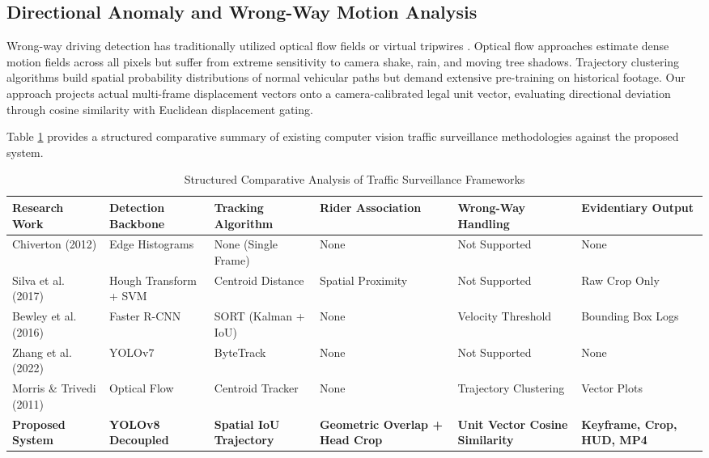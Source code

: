 \documentclass[conference]{IEEEtran}
\begin{document}
\subsection{Directional Anomaly and Wrong-Way Motion Analysis}
Wrong-way driving detection has traditionally utilized optical flow fields or virtual tripwires \cite{veeraraghavan2003computer}. Optical flow approaches estimate dense motion fields across all pixels but suffer from extreme sensitivity to camera shake, rain, and moving tree shadows. Trajectory clustering algorithms \cite{morris2011trajectory} build spatial probability distributions of normal vehicular paths but demand extensive pre-training on historical footage. Our approach projects actual multi-frame displacement vectors onto a camera-calibrated legal unit vector, evaluating directional deviation through cosine similarity with Euclidean displacement gating.

Table \ref{tab:comparison} provides a structured comparative summary of existing computer vision traffic surveillance methodologies against the proposed system.

\begin{table}[t]
\caption{Structured Comparative Analysis of Traffic Surveillance Frameworks}
\label{tab:comparison}
\centering
\begin{tabular}{llllll}
\toprule
\textbf{Research Work} & \textbf{Detection Backbone} & \textbf{Tracking Algorithm} & \textbf{Rider Association} & \textbf{Wrong-Way Handling} & \textbf{Evidentiary Output} \\
\midrule
Chiverton (2012) \cite{chiverton2012helmet} & Edge Histograms & None (Single Frame) & None & Not Supported & None \\
Silva et al. (2017) \cite{silva2017helmet} & Hough Transform + SVM & Centroid Distance & Spatial Proximity & Not Supported & Raw Crop Only \\
Bewley et al. (2016) \cite{bewley2016simple} & Faster R-CNN & SORT (Kalman + IoU) & None & Velocity Threshold & Bounding Box Logs \\
Zhang et al. (2022) \cite{zhang2022bytetrack} & YOLOv7 & ByteTrack & None & Not Supported & None \\
Morris \& Trivedi (2011) \cite{morris2011trajectory} & Optical Flow & Centroid Tracker & None & Trajectory Clustering & Vector Plots \\
\textbf{Proposed System} & \textbf{YOLOv8 Decoupled} & \textbf{Spatial IoU Trajectory} & \textbf{Geometric Overlap + Head Crop} & \textbf{Unit Vector Cosine Similarity} & \textbf{Keyframe, Crop, HUD, MP4} \\
\bottomrule
\end{tabular}
\end{table}
\end{document}
